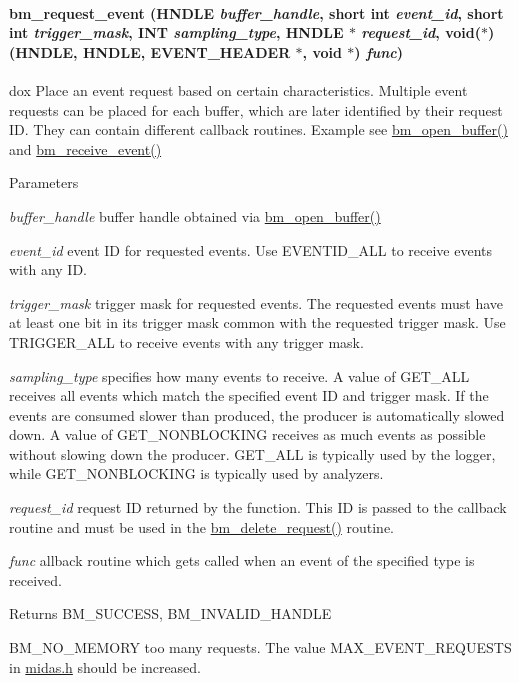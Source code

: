\paragraph[{bm\_\-request\_\-event}]{ bm\_\-request\_\-event (HNDLE {\em buffer\_\-handle}, \/  short int {\em event\_\-id}, \/  short int {\em trigger\_\-mask}, \/  {\bf INT} {\em sampling\_\-type}, \/  HNDLE $\ast$ {\em request\_\-id}, \/  void($\ast$)(HNDLE, HNDLE, {\bf EVENT\_\-HEADER} $\ast$, void $\ast$) {\em func})}\hfill\label{group__bmfunctionc_gabf663d96482aeede1846487a7ada8184}
dox Place an event request based on certain characteristics. Multiple event requests can be placed for each buffer, which are later identified by their request ID. They can contain different callback routines. Example see \hyperlink{group__bmfunctionc_gae9636ff3e34ee94e31cb292bd07a679d}{bm\_\-open\_\-buffer()} and \hyperlink{group__bmfunctionc_ga2fd8bb52ad5282be3ce076e84bc007fa}{bm\_\-receive\_\-event()} 
\begin{DoxyParams}{Parameters}
\item[{\em buffer\_\-handle}]buffer handle obtained via \hyperlink{group__bmfunctionc_gae9636ff3e34ee94e31cb292bd07a679d}{bm\_\-open\_\-buffer()} \item[{\em event\_\-id}]event ID for requested events. Use EVENTID\_\-ALL to receive events with any ID. \item[{\em trigger\_\-mask}]trigger mask for requested events. The requested events must have at least one bit in its trigger mask common with the requested trigger mask. Use TRIGGER\_\-ALL to receive events with any trigger mask. \item[{\em sampling\_\-type}]specifies how many events to receive. A value of GET\_\-ALL receives all events which match the specified event ID and trigger mask. If the events are consumed slower than produced, the producer is automatically slowed down. A value of GET\_\-NONBLOCKING receives as much events as possible without slowing down the producer. GET\_\-ALL is typically used by the logger, while GET\_\-NONBLOCKING is typically used by analyzers. \item[{\em request\_\-id}]request ID returned by the function. This ID is passed to the callback routine and must be used in the \hyperlink{group__bmfunctionc_ga33221a55f8c90e411dea5eb34a2ee773}{bm\_\-delete\_\-request()} routine. \item[{\em func}]allback routine which gets called when an event of the specified type is received. \end{DoxyParams}
\begin{DoxyReturn}{Returns}
BM\_\-SUCCESS, BM\_\-INVALID\_\-HANDLE \par
 BM\_\-NO\_\-MEMORY too many requests. The value MAX\_\-EVENT\_\-REQUESTS in \hyperlink{midas_8h}{midas.h} should be increased. 
\end{DoxyReturn}


